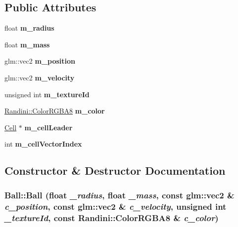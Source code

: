 \subsection*{Public Attributes}
\begin{DoxyCompactItemize}
\item 
\hypertarget{structBall_a3bc6acf9f3013d514e9a74c06a81f0cc}{
float {\bfseries m\_\-radius}}
\label{structBall_a3bc6acf9f3013d514e9a74c06a81f0cc}

\item 
\hypertarget{structBall_a22c5fc77318cc724a5e7aad38df1ce85}{
float {\bfseries m\_\-mass}}
\label{structBall_a22c5fc77318cc724a5e7aad38df1ce85}

\item 
\hypertarget{structBall_a5daf4402dc74b3da7806549c120344bd}{
glm::vec2 {\bfseries m\_\-position}}
\label{structBall_a5daf4402dc74b3da7806549c120344bd}

\item 
\hypertarget{structBall_a9537fb69d4b0e4370e3aba2f6b894579}{
glm::vec2 {\bfseries m\_\-velocity}}
\label{structBall_a9537fb69d4b0e4370e3aba2f6b894579}

\item 
\hypertarget{structBall_a9abd8e7caf65e1e6b96cbc101eb95ac5}{
unsigned int {\bfseries m\_\-textureId}}
\label{structBall_a9abd8e7caf65e1e6b96cbc101eb95ac5}

\item 
\hypertarget{structBall_aa8b1fa3be1200bb682524c230e424542}{
\hyperlink{structRandini_1_1ColorRGBA8}{Randini::ColorRGBA8} {\bfseries m\_\-color}}
\label{structBall_aa8b1fa3be1200bb682524c230e424542}

\item 
\hypertarget{structBall_aa56d84ee36d426c37108b3cd55e548a5}{
\hyperlink{structCell}{Cell} $\ast$ {\bfseries m\_\-cellLeader}}
\label{structBall_aa56d84ee36d426c37108b3cd55e548a5}

\item 
\hypertarget{structBall_a80db4312481afac22d0f00487a3e759f}{
int {\bfseries m\_\-cellVectorIndex}}
\label{structBall_a80db4312481afac22d0f00487a3e759f}

\end{DoxyCompactItemize}


\subsection{Constructor \& Destructor Documentation}
\hypertarget{structBall_a39a1cb33a6f2e3a4c692144967c3f4ef}{
\subsubsection[{Ball}]{\setlength{\rightskip}{0pt plus 5cm}Ball::Ball (float {\em \_\-radius}, \/  float {\em \_\-mass}, \/  const glm::vec2 \& {\em c\_\-position}, \/  const glm::vec2 \& {\em c\_\-velocity}, \/  unsigned int {\em \_\-textureId}, \/  const {\bf Randini::ColorRGBA8} \& {\em c\_\-color})}}
\label{structBall_a39a1cb33a6f2e3a4c692144967c3f4ef}


